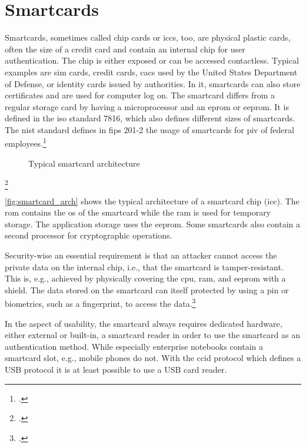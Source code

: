 \section{Smartcards}

Smartcards, sometimes called chip cards or \glspl{icc}, too, are physical plastic cards, often the size of a credit card and contain an internal chip for user authentication. The chip is either exposed or can be accessed contactless. Typical examples are \gls{sim} cards, credit cards, \glspl{cac} used by the United States Department of Defense, or identity cards issued by authorities. In \gls{it}, smartcards can also store certificates and are used for computer log on. The smartcard differs from a regular storage card by having a microprocessor and an \gls{eprom} or \gls{eeprom}. It is defined in the \gls{iso} standard 7816, which also defines different sizes of smartcards. The \gls{nist} standard defines in \gls{fips} 201-2 the usage of smartcards for \gls{piv} of federal employees.\footcites[See][525--527]{eckert-it-sec-9}[See][]{iso7816}[See][6--9]{1698485}[See][]{FIPS201-2}


\begin{figure}[hbt]
	\centering
	
	\caption[Typical smartcard architecture]{Typical smartcard architecture\footnotemark}
	\label{fig:smartcard_arch}
\end{figure}
\footcitetexts[Source: diagram by author, based on][33]{electronic_certification_mobile_devices}[][228]{1698485}

\autoref{fig:smartcard_arch} shows the typical architecture of a smartcard chip (\gls{icc}). The \gls{rom} contains the \gls{os} of the smartcard while the \gls{ram} is used for temporary storage. The application storage uses the \gls{eeprom}. Some smartcards also contain a second processor for cryptographic operations.

Security-wise an essential requirement is that an attacker cannot access the private data on the internal chip, i.e., that the smartcard is tamper-resistant. This is, e.g., achieved by physically covering the \gls{cpu}, \gls{ram}, and \gls{eeprom} with a shield. The data stored on the smartcard can itself protected by using a \gls{pin} or biometrics, such as a fingerprint, to access the data.\footcites[See][34]{265831}[See][228]{1698485}

In the aspect of usability, the smartcard always requires dedicated hardware, either external or built-in, a smartcard reader in order to use the smartcard as an authentication method. While especially enterprise notebooks contain a smartcard slot, e.g., mobile phones do not. With the \gls{ccid} protocol which defines a USB protocol it is at least possible to use a USB card reader.